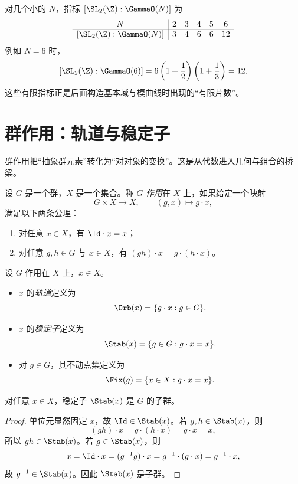 \begin{example}
对几个小的 $N$，指标 $[\SL_2(\Z):\GammaO(N)]$ 为
\[
\begin{array}{c|ccccc}
N & 2 & 3 & 4 & 5 & 6 \\\hline
[\SL_2(\Z):\GammaO(N)] & 3 & 4 & 6 & 6 & 12
\end{array}
\]
例如 $N=6$ 时，
\[
[\SL_2(\Z):\GammaO(6)]
=6\left(1+\frac12\right)\left(1+\frac13\right)=12.
\]
这些有限指标正是后面构造基本域与模曲线时出现的“有限片数”。
\end{example}

\section{群作用：轨道与稳定子}

群作用把“抽象群元素”转化为“对对象的变换”。这是从代数进入几何与组合的桥梁。

\begin{definition}
设 $G$ 是一个群，$X$ 是一个集合。称 $G$ \emph{作用}在 $X$ 上，如果给定一个映射
\[
G\times X\longrightarrow X,
\qquad (g,x)\longmapsto g\cdot x,
\]
满足以下两条公理：
\begin{enumerate}
  \item 对任意 $x\in X$，有 $\Id\cdot x=x$；
  \item 对任意 $g,h\in G$ 与 $x\in X$，有 $(gh)\cdot x=g\cdot(h\cdot x)$。
\end{enumerate}
\end{definition}

\begin{definition}
设 $G$ 作用在 $X$ 上，$x\in X$。
\begin{itemize}
  \item $x$ 的\emph{轨道}定义为
  \[
  \Orb(x)=\{g\cdot x:g\in G\}.
  \]
  \item $x$ 的\emph{稳定子}定义为
  \[
  \Stab(x)=\{g\in G:g\cdot x=x\}.
  \]
  \item 对 $g\in G$，其不动点集定义为
  \[
  \Fix(g)=\{x\in X:g\cdot x=x\}.
  \]
\end{itemize}
\end{definition}

\begin{proposition}
对任意 $x\in X$，稳定子 $\Stab(x)$ 是 $G$ 的子群。
\end{proposition}

\begin{proof}
单位元显然固定 $x$，故 $\Id\in \Stab(x)$。若 $g,h\in \Stab(x)$，则
\[
(gh)\cdot x=g\cdot(h\cdot x)=g\cdot x=x,
\]
所以 $gh\in \Stab(x)$。若 $g\in \Stab(x)$，则
\[
x=\Id\cdot x=(g^{-1}g)\cdot x=g^{-1}\cdot(g\cdot x)=g^{-1}\cdot x,
\]
故 $g^{-1}\in \Stab(x)$。因此 $\Stab(x)$ 是子群。
\end{proof}

